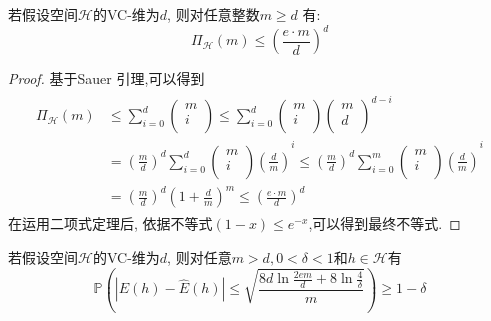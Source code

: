 \begin{corollary}
若假设空间$\mathcal{H}$的VC-维为$d$, 则对任意整数$m\ge d$ 有:
\begin{equation}
\Pi _{\mathcal{H}}\left( m \right) \le \left( \frac{e\cdot m}{d} \right) ^d
\end{equation}
\end{corollary}

\begin{proof}
基于Sauer 引理,可以得到
\begin{eqnarray}
\begin{aligned}
\Pi _{\mathcal{H}}\left( m \right) &\le \sum_{i=0}^d{\left( \begin{array}{c}
	m\\
	i\\
\end{array} \right)}
\le \sum_{i=0}^d{\left( \begin{array}{c}
	m\\
	i\\
\end{array} \right)}\left( \begin{array}{c}
	m\\
	d\\
\end{array} \right) ^{d-i} \\
&=\left( \frac{m}{d} \right) ^d\sum_{i=0}^d{\left( \begin{array}{c}
	m\\
	i\\
\end{array} \right) \left( \frac{d}{m} \right)}^i
\le \left( \frac{m}{d} \right) ^d\sum_{i=0}^m{\left( \begin{array}{c}
	m\\
	i\\
\end{array} \right) \left( \frac{d}{m} \right)}^i \\
&=\left( \frac{m}{d} \right) ^d\left( 1+\frac{d}{m} \right) ^m
\le \left( \frac{e\cdot m}{d} \right) ^d
\end{aligned}
\end{eqnarray}
在运用二项式定理后, 依据不等式$(1-x)\le e^{-x}$,可以得到最终不等式.  
\end{proof}

\begin{theorem}\label{thm:5}
若假设空间$\mathcal{H}$的VC-维为$d$, 则对任意$m>d,0<\delta<1$和$h\in \mathcal{H}$有
\begin{equation}
\mathbb{P}\left( \left| E\left( h \right) -\hat{E}\left( h \right) \right|\le \sqrt{\frac{8d\ln \frac{2em}{d}+8\ln \frac{4}{\delta}}{m}} \right) \ge 1-\delta
\end{equation}
\end{theorem}

